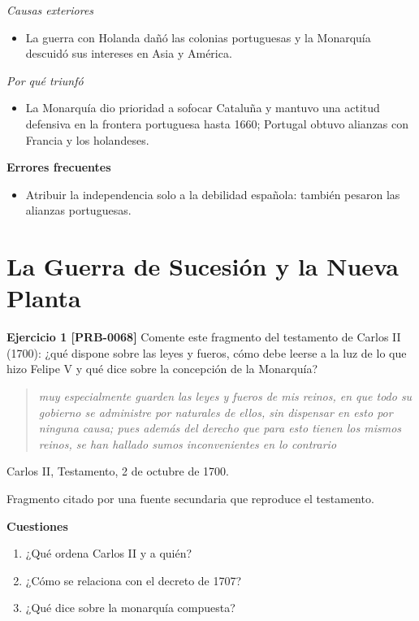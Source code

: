 \documentclass{book}
\begin{document}
\noindent\textit{Causas exteriores}
\begin{itemize}
\item La guerra con Holanda dañó las colonias portuguesas y la Monarquía descuidó sus intereses en Asia y América.
\end{itemize}

\noindent\textit{Por qué triunfó}
\begin{itemize}
\item La Monarquía dio prioridad a sofocar Cataluña y mantuvo una actitud defensiva en la frontera portuguesa hasta 1660; Portugal obtuvo alianzas con Francia y los holandeses.
\end{itemize}

\noindent\textbf{Errores frecuentes}
\begin{itemize}
\item Atribuir la independencia solo a la debilidad española: también pesaron las alianzas portuguesas.
\end{itemize}

\section{La Guerra de Sucesión y la Nueva Planta}

\noindent\textbf{Ejercicio 1 [PRB-0068]}
Comente este fragmento del testamento de Carlos II (1700): ¿qué dispone sobre las leyes y fueros, cómo debe leerse a la luz de lo que hizo Felipe V y qué dice sobre la concepción de la Monarquía?


\begin{quote}
\itshape muy especialmente guarden las leyes y fueros de mis reinos, en que todo su gobierno se administre por naturales de ellos, sin dispensar en esto por ninguna causa; pues además del derecho que para esto tienen los mismos reinos, se han hallado sumos inconvenientes en lo contrario
\end{quote}
{\noindent\footnotesize Carlos II, Testamento, 2 de octubre de 1700.\par}
{\noindent\footnotesize Fragmento citado por una fuente secundaria que reproduce el testamento.\par}

\noindent\textbf{Cuestiones}
\begin{enumerate}
\item ¿Qué ordena Carlos II y a quién?
\item ¿Cómo se relaciona con el decreto de 1707?
\item ¿Qué dice sobre la monarquía compuesta?
\end{enumerate}
\end{document}
